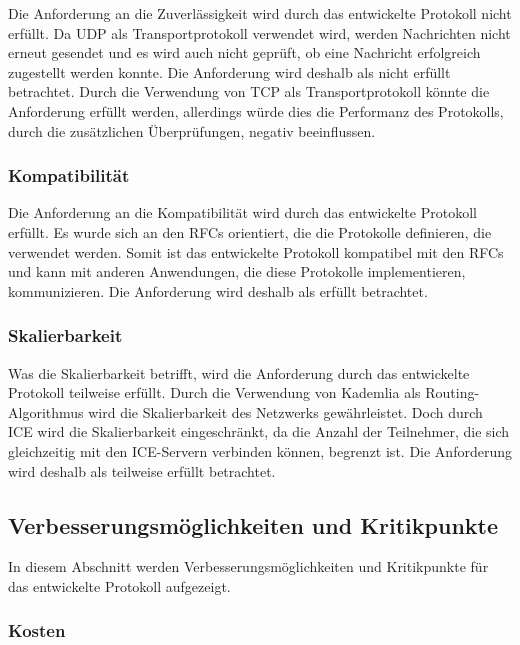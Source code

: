 Die Anforderung an die Zuverlässigkeit wird durch das entwickelte Protokoll nicht erfüllt. Da UDP als Transportprotokoll verwendet wird, werden Nachrichten nicht erneut gesendet und es wird auch nicht geprüft, ob eine Nachricht erfolgreich zugestellt werden konnte. Die Anforderung wird deshalb als nicht erfüllt betrachtet. Durch die Verwendung von TCP als Transportprotokoll könnte die Anforderung erfüllt werden, allerdings würde dies die Performanz des Protokolls, durch die zusätzlichen Überprüfungen, negativ beeinflussen. 


\subsubsection{Kompatibilität}

Die Anforderung an die Kompatibilität wird durch das entwickelte Protokoll erfüllt. Es wurde sich an den RFCs orientiert, die die Protokolle definieren, die verwendet werden. Somit ist das entwickelte Protokoll kompatibel mit den RFCs und kann mit anderen Anwendungen, die diese Protokolle implementieren, kommunizieren. Die Anforderung wird deshalb als erfüllt betrachtet.


\subsubsection{Skalierbarkeit}

Was die Skalierbarkeit betrifft, wird die Anforderung durch das entwickelte Protokoll teilweise erfüllt. Durch die Verwendung von Kademlia als Routing-Algorithmus wird die Skalierbarkeit des Netzwerks gewährleistet. Doch durch ICE wird die Skalierbarkeit eingeschränkt, da die Anzahl der Teilnehmer, die sich gleichzeitig mit den ICE-Servern verbinden können, begrenzt ist. Die Anforderung wird deshalb als teilweise erfüllt betrachtet. 



\subsection{Verbesserungsmöglichkeiten und Kritikpunkte}

In diesem Abschnitt werden Verbesserungsmöglichkeiten und Kritikpunkte für das entwickelte Protokoll aufgezeigt.

\subsubsection{Kosten}


